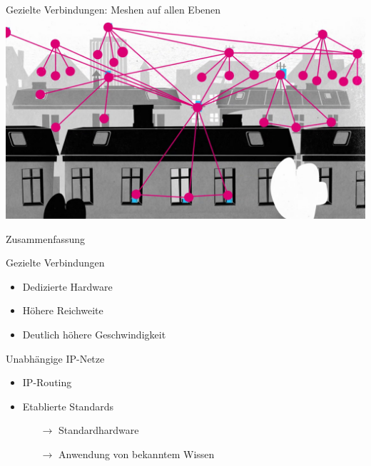 \documentclass{beamer}
\begin{document}
	\begin{frame}[standout]{Gezielte Verbindungen: Meshen auf allen Ebenen}
		\includegraphics[width=\framewidth]{media/dachzudach.png}
	\end{frame}
	\begin{frame}{Zusammenfassung}
		\begin{block}{Gezielte Verbindungen}
		\begin{itemize}
			\item Dedizierte Hardware
			\item Höhere Reichweite
			\item Deutlich höhere Geschwindigkeit
		\end{itemize}
		\end{block}
		\begin{block}{Unabhängige IP-Netze}
		\begin{itemize}
			\item IP-Routing
            \item Etablierte Standards
            \begin{itemize}
			\item[$\rightarrow$] Standardhardware
			\item[$\rightarrow$] Anwendung von bekanntem Wissen
            \end{itemize}
		\end{itemize}
		\end{block}
	\end{frame}
\end{document}
